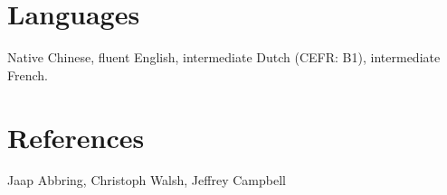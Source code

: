 \documentclass[margin,line]{res}
\newenvironment{list1}{
  \begin{list}{\ding{113}}{%
      \setlength{\itemsep}{0in}
      \setlength{\parsep}{0in} \setlength{\parskip}{0in}
      \setlength{\topsep}{0in} \setlength{\partopsep}{0in} 
      \setlength{\leftmargin}{0.17in}}}{\end{list}}
\begin{document}
\begin{resume}

\section{\sc Languages} 
Native Chinese, fluent English, intermediate Dutch (CEFR: B1), intermediate French.

\section{\sc References}
Jaap Abbring, Christoph Walsh, Jeffrey Campbell

\end{resume}
\end{document}
